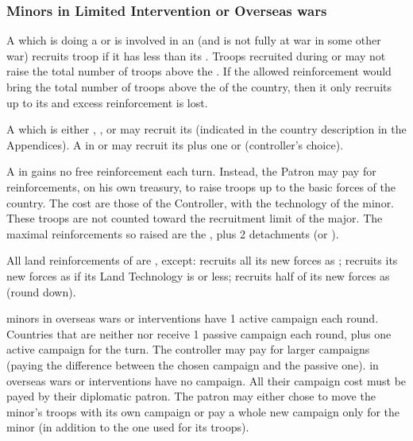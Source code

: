 \subsubsection{Minors in Limited Intervention or Overseas wars}
\bparag A \MIN which is doing a  or is involved in
an  (and is not fully at war in some other war) recruits
troop if it has less than its .
\bparag Troops recruited during  or
 may not raise the total number of troops above the
.
\bparag If the allowed reinforcement would bring the total number of troops
above the  of the country, then it only recruits up to its
 and excess reinforcement is lost.

\bparag A \MIN which is either \Neutral, \RM, \SUB or \MA may recruit its
 (indicated in the country description in the
Appendices).
\bparag A \MIN in \CE or \EW may recruit its  plus
one \LD or \ND (controller's choice).

\bparag A \MIN in \VASSAL gains no free reinforcement each turn.
\bparag Instead, the Patron may pay for reinforcements, on his own treasury,
to raise troops up to the basic forces of the country.
\bparag The cost are those of the Controller, with the technology of the
minor.
\bparag These troops are not counted toward the recruitment limit of the
major.
\bparag The maximal reinforcements so raised are the , plus 2 detachments (\LD or \ND).

\aparag[Moral]
\bparag All land reinforcements of \MIN are , except:
\bparag \paysSuede recruits all its new forces as ;
\bparag \paysSuisse recruits its new forces as  if its Land
Technology is \TMUS or less;
\bparag \paysPerse recruits half of its new forces as  (round
down).

\aparag[Campaigns]
\bparag \Neutral minors in overseas wars or interventions have 1 active campaign
each round.
\bparag Countries that are neither \Neutral nor \VASSAL receive 1 passive
campaign each round, plus one active campaign for the turn. The controller may
pay for larger campaigns (paying the difference between the chosen campaign
and the passive one).
\bparag \VASSAL in overseas wars or interventions have no campaign. All their
campaign cost must be payed by their diplomatic patron. The patron may either
chose to move the minor's troops with its own campaign or pay a whole new
campaign only for the minor (in addition to the one used for its troops).


